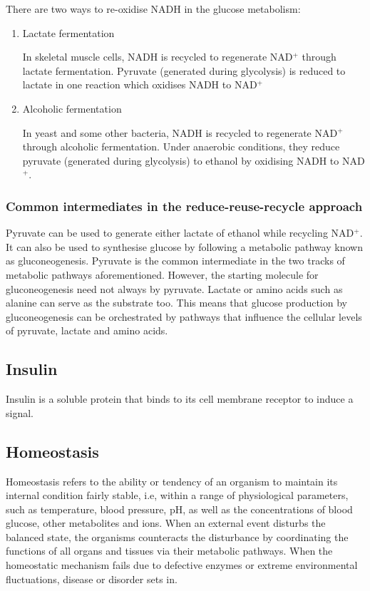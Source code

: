 \documentclass[11pt]{article}
\begin{document}
There are two ways to re-oxidise NADH in the glucose metabolism:

\begin{enumerate}
\item Lactate fermentation
\label{sec:org739063c}

In skeletal muscle cells, NADH is recycled to regenerate NAD\(^+\) through lactate fermentation. Pyruvate (generated during glycolysis) is reduced to lactate in one reaction which oxidises NADH to NAD\(^+\)

\item Alcoholic fermentation
\label{sec:org7ad97d6}

In yeast and some other bacteria, NADH is recycled to regenerate NAD\(^+\) through alcoholic fermentation. Under anaerobic conditions, they reduce pyruvate (generated during glycolysis) to ethanol by oxidising NADH to NAD\(^+\).
\end{enumerate}

\subsubsection{Common intermediates in the reduce-reuse-recycle approach}
\label{sec:orgb5da0a4}
Pyruvate can be used to generate either lactate of ethanol while recycling NAD\(^+\). It can also be used to synthesise glucose by following a metabolic pathway known as gluconeogenesis. Pyruvate is the common intermediate in the two tracks of metabolic pathways aforementioned. However, the starting molecule for gluconeogenesis need not always by pyruvate. Lactate or amino acids such as alanine can serve as the substrate too. This means that glucose production by gluconeogenesis can be orchestrated by pathways that influence the cellular levels of pyruvate, lactate and amino acids.

\newpage

\subsection{Insulin}
\label{sec:org347fed3}
Insulin is a soluble protein that binds to its cell membrane receptor to induce a signal.

\subsection{Homeostasis}
\label{sec:orgb20b5b8}
Homeostasis refers to the ability or tendency of an organism to maintain its internal condition fairly stable, i.e, within a range of physiological parameters, such as temperature, blood pressure, pH, as well as the concentrations of blood glucose, other metabolites and ions. When an external event disturbs the balanced state, the organisms counteracts the disturbance by coordinating the functions of all organs and tissues via their metabolic pathways. When the homeostatic mechanism fails due to defective enzymes or extreme environmental fluctuations, disease or disorder sets in.
\end{document}
